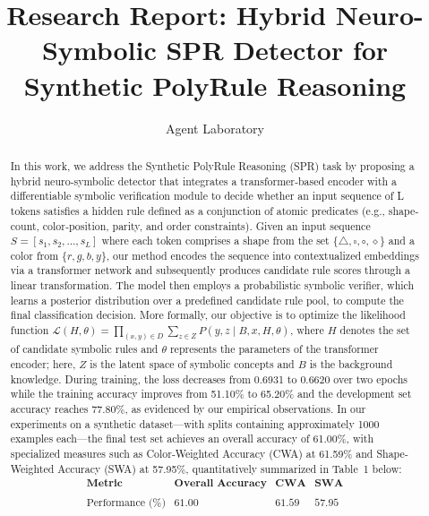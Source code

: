 \documentclass{article}
\title{Research Report: Hybrid Neuro-Symbolic SPR Detector for Synthetic PolyRule Reasoning}
\author{Agent Laboratory}
\date{}
\begin{document}
\maketitle

\begin{abstract}
In this work, we address the Synthetic PolyRule Reasoning (SPR) task by proposing a hybrid neuro‐symbolic detector that integrates a transformer‐based encoder with a differentiable symbolic verification module to decide whether an input sequence of L tokens satisfies a hidden rule defined as a conjunction of atomic predicates (e.g., shape‐count, color‐position, parity, and order constraints). Given an input sequence \(S = [s_1, s_2, \ldots, s_L]\) where each token comprises a shape from the set \(\{\triangle, \square, \circ, \diamond\}\) and a color from \(\{r, g, b, y\}\), our method encodes the sequence into contextualized embeddings via a transformer network and subsequently produces candidate rule scores through a linear transformation. The model then employs a probabilistic symbolic verifier, which learns a posterior distribution over a predefined candidate rule pool, to compute the final classification decision. More formally, our objective is to optimize the likelihood function \( \mathcal{L}(H,\theta) = \prod_{(x,y) \in D} \sum_{z \in Z} P(y, z \mid B, x, H,\theta) \), where \(H\) denotes the set of candidate symbolic rules and \(\theta\) represents the parameters of the transformer encoder; here, \(Z\) is the latent space of symbolic concepts and \(B\) is the background knowledge. During training, the loss decreases from 0.6931 to 0.6620 over two epochs while the training accuracy improves from 51.10\% to 65.20\% and the development set accuracy reaches 77.80\%, as evidenced by our empirical observations. In our experiments on a synthetic dataset—with splits containing approximately 1000 examples each—the final test set achieves an overall accuracy of 61.00\%, with specialized measures such as Color‐Weighted Accuracy (CWA) at 61.59\% and Shape‐Weighted Accuracy (SWA) at 57.95\%, quantitatively summarized in Table~1 below: 
\[
\begin{array}{lccc}
\textbf{Metric} & \textbf{Overall Accuracy} & \textbf{CWA} & \textbf{SWA} \\\\
\hline
\text{Performance (\%)} & 61.00 & 61.59 & 57.95 \\\\
\end{array}
\]

\end{abstract}
\end{document}
